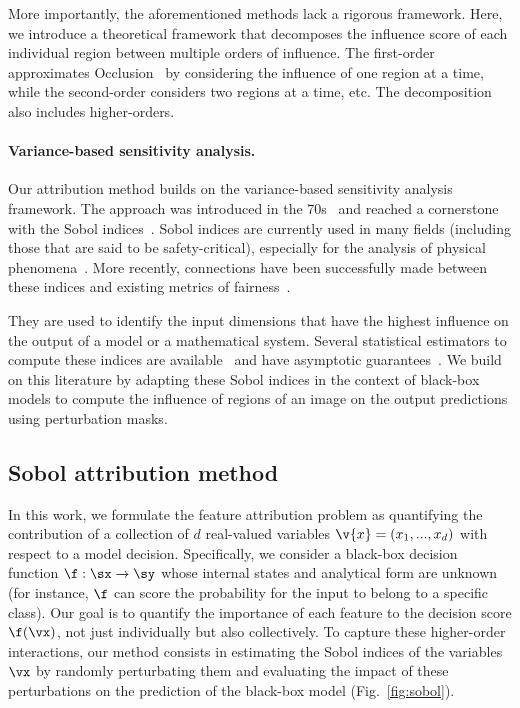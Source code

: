 More importantly, the aforementioned methods lack a rigorous framework. Here, we introduce a theoretical framework that decomposes the influence score of each individual region between multiple orders of influence.
The first-order approximates Occlusion~\cite{zeiler2014visualizing} by considering the influence of one region at a time, while the second-order considers two regions at a time, etc. The decomposition also includes higher-orders.

\paragraph{Variance-based sensitivity analysis.} Our attribution method builds on the variance-based sensitivity analysis framework.
The approach was introduced in the 70s~\cite{cukier1973study} and reached a cornerstone with the Sobol indices~\cite{sobol1993sensitivity}.
Sobol indices are currently used in many fields (including those that are said to be safety-critical), especially for the analysis of physical phenomena~\cite{iooss2015}. More recently, connections have been successfully made between these indices and existing metrics of fairness~\cite{benesse2021fairness}.

They are used to identify the input dimensions that have the highest influence on the output of a model or a mathematical system.
Several statistical estimators to compute these indices are available~\cite{saltelli2010variance, marrel2009calculations, janon2014asymptotic, owen2013better, tarantola2006random} and have asymptotic guarantees~\cite{janon2014asymptotic, da2013efficient, tissot2012bias}.
We build on this literature by adapting these Sobol indices in the context of black-box models to compute the influence of regions of an image on the output predictions using perturbation masks.

\subsection{Sobol attribution method}
\label{sobol:sec:method}

In this work, we formulate the feature attribution problem as quantifying the contribution of a collection of $d$ real-valued variables $\v{x} = (x_1, ..., x_d)$  with respect to a model decision. Specifically, we consider a black-box decision function $\f : \sx \to \sy$ whose internal states and analytical form are unknown (for instance, $\f$ can score the probability for the input to belong to a specific class). Our goal is to quantify the importance of each feature to the decision score $\f(\vx)$, not just individually but also collectively. To capture these higher-order interactions, our method consists in estimating the Sobol indices of the variables $\vx$ by randomly perturbating them and evaluating the impact of these perturbations on the prediction of the black-box model (Fig.~\ref{fig:sobol}).

